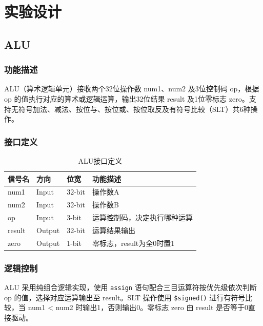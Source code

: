 \section{实验设计}

\subsection{ALU}\label{sub:alu}

\subsubsection{功能描述}
ALU（算术逻辑单元）接收两个32位操作数 num1、num2 及3位控制码 op，根据 op 的值执行对应的算术或逻辑运算，输出32位结果 result 及1位零标志 zero。支持无符号加法、减法、按位与、按位或、按位取反及有符号比较（SLT）共6种操作。

\subsubsection{接口定义}

\begin{table}[htp]
\caption{ALU接口定义}\label{tab:signaldef}
\begin{center}
	\begin{tabular}{|l|l|l|p{6cm}|}
	\hline
	\textbf{信号名} & \textbf{方向} & \textbf{位宽} & \textbf{功能描述}\\ \hline \hline
	num1   & Input  & 32-bit & 操作数A \\ \hline
	num2   & Input  & 32-bit & 操作数B \\ \hline
	op     & Input  & 3-bit  & 运算控制码，决定执行哪种运算 \\ \hline
	result & Output & 32-bit & 运算结果输出 \\ \hline
	zero   & Output & 1-bit  & 零标志，result为全0时置1 \\ \hline
	\end{tabular}
\end{center}
\end{table}

\subsubsection{逻辑控制}
ALU 采用纯组合逻辑实现，使用 \texttt{assign} 语句配合三目运算符按优先级依次判断 op 的值，选择对应运算输出至 result。SLT 操作使用 \texttt{\$signed()} 进行有符号比较，当 num1 < num2 时输出1，否则输出0。零标志 zero 由 result 是否等于0直接驱动。

